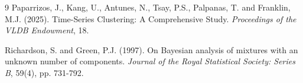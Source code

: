 \documentclass[twoside]{article}
\begin{document}
\begin{thebibliography}{9}
Paparrizos, J., Kang, U., Antunes, N., Tsay, P.S., Palpanas, T. and Franklin, M.J. (2025). Time-Series Clustering: A Comprehensive Study. \textit{Proceedings of the VLDB Endowment}, 18.




Richardson, S. and Green, P.J. (1997). On Bayesian analysis of mixtures with an unknown number of components. \textit{Journal of the Royal Statistical Society: Series B}, 59(4), pp. 731-792.






\end{thebibliography}
\end{document}
